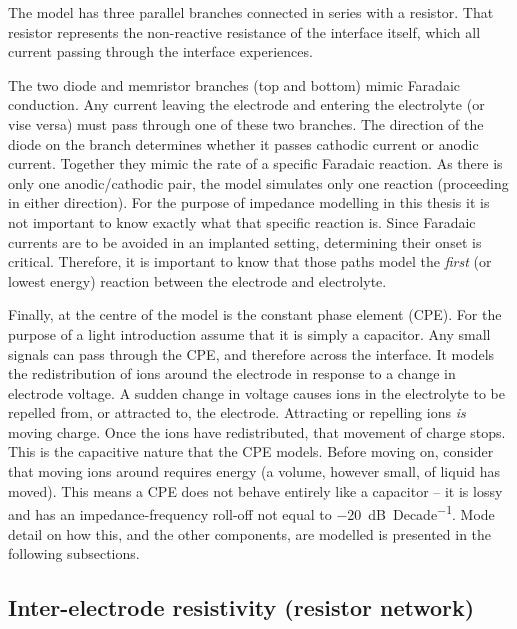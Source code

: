   The model has three parallel branches connected in series with a resistor.
  That resistor represents the non-reactive resistance of the interface itself, which all current passing through the interface experiences.

  The two diode and memristor branches (top and bottom) mimic Faradaic conduction.
  Any current leaving the electrode and entering the electrolyte (or vise versa) must pass through one of these two branches.
  The direction of the diode on the branch determines whether it passes cathodic current or anodic current.
  Together they mimic the rate of a specific Faradaic reaction.
  As there is only one anodic/cathodic pair, the model simulates only one reaction (proceeding in either direction).
  For the purpose of impedance modelling in this thesis it is not important to know exactly what that specific reaction is.
  Since Faradaic currents are to be avoided in an implanted setting, determining their onset is critical.
  Therefore, it is important to know that those paths model the \emph{first} (or lowest energy) reaction between the electrode and electrolyte.

  Finally, at the centre of the model is the constant phase element (CPE).
  For the purpose of a light introduction assume that it is simply a capacitor.
  Any small signals can pass through the CPE, and therefore across the interface.
  It models the redistribution of ions around the electrode in response to a change in electrode voltage.
  A sudden change in voltage causes ions in the electrolyte to be repelled from, or attracted to, the electrode.
  Attracting or repelling ions \emph{is} moving charge.
  Once the ions have redistributed, that movement of charge stops.
  This is the capacitive nature that the CPE models.
  Before moving on, consider that moving ions around requires energy (a volume, however small, of liquid has moved).
  This means a CPE does not behave entirely like a capacitor -- it is lossy and has an impedance-frequency roll-off not equal to \SI{-20}{\deci\bel\per Decade}.
  Mode detail on how this, and the other components, are modelled is presented in the following subsections.


  \subsection{Inter-electrode resistivity (resistor network)}


